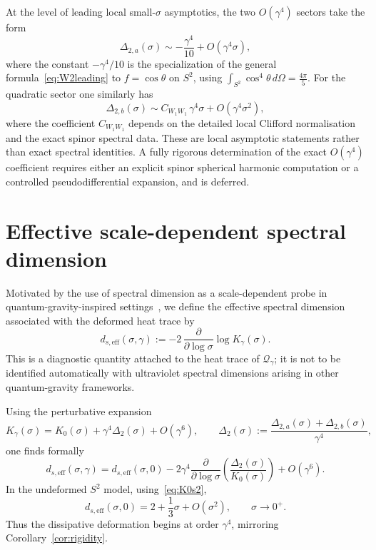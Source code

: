 \documentclass[11pt,a4paper]{article}
\numberwithin{equation}{section}
\theoremstyle{definition}
\newcommand{\Qg}{\mathcal{Q}_\gamma}
\begin{document}
At the level of leading local small-$\sigma$ asymptotics, the two
$O(\gamma^4)$ sectors take the form
\begin{equation}
\Delta_{2,a}(\sigma)\sim -\frac{\gamma^4}{10}+O(\gamma^4\sigma),
\end{equation}
where the constant $-\gamma^4/10$ is the specialization of the general
formula~\eqref{eq:W2leading} to $f=\cos\theta$ on $S^2$, using
$\int_{S^2}\cos^4\theta\,d\Omega = \tfrac{4\pi}{5}$. For the quadratic
sector one similarly has
\begin{equation}
\Delta_{2,b}(\sigma)\sim C_{W_1W_1}\,\gamma^4\sigma+O(\gamma^4\sigma^2),
\end{equation}
where the coefficient $C_{W_1W_1}$ depends on the detailed local Clifford
normalisation and the exact spinor spectral data. These are local
asymptotic statements rather than exact spectral identities. A fully
rigorous determination of the exact $O(\gamma^4)$ coefficient requires
either an explicit spinor spherical harmonic computation or a controlled
pseudodifferential expansion, and is deferred.

\section{Effective scale-dependent spectral dimension}
\label{sec:spectraldim}

Motivated by the use of spectral dimension as a scale-dependent probe in
quantum-gravity-inspired
settings~\cite{AmbjornJurkiewiczLoll2005,AlkoferSaueressigZanusso2015},
we define the effective spectral dimension associated with the deformed
heat trace by
\begin{equation}
d_{s,\mathrm{eff}}(\sigma,\gamma):=-2\,\frac{\partial}{\partial\log\sigma}
\log K_\gamma(\sigma).
\label{eq:dseff_def}
\end{equation}
This is a diagnostic quantity attached to the heat trace of $\Qg$; it is
not to be identified automatically with ultraviolet spectral dimensions
arising in other quantum-gravity frameworks.

Using the perturbative expansion
\begin{equation}
K_\gamma(\sigma)=K_0(\sigma)+\gamma^4\Delta_2(\sigma)+O(\gamma^6),
\qquad
\Delta_2(\sigma):=\frac{\Delta_{2,a}(\sigma)+\Delta_{2,b}(\sigma)}{\gamma^4},
\end{equation}
one finds formally
\begin{equation}
d_{s,\mathrm{eff}}(\sigma,\gamma)=d_{s,\mathrm{eff}}(\sigma,0)
-2\gamma^4\frac{\partial}{\partial \log\sigma}\!\left(
\frac{\Delta_2(\sigma)}{K_0(\sigma)}\right)+O(\gamma^6).
\label{eq:dseffformal}
\end{equation}
In the undeformed $S^2$ model, using~\eqref{eq:K0s2},
\begin{equation}
d_{s,\mathrm{eff}}(\sigma,0)=2+\frac{1}{3}\sigma+O(\sigma^2),
\qquad \sigma\to 0^+.
\label{eq:dseff0}
\end{equation}
Thus the dissipative deformation begins at order $\gamma^4$, mirroring
Corollary~\ref{cor:rigidity}.
\end{document}
